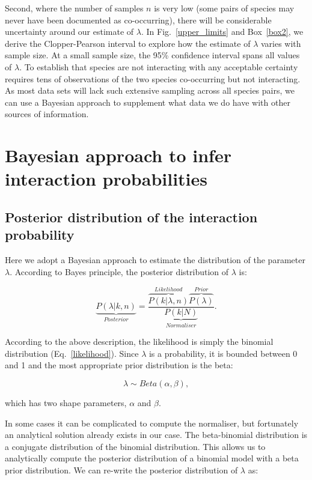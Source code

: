 \documentclass[12pt]{article}
\begin{document}
\begin{spacing}{2.0}
  Second, where the number of samples $n$ is very low (some pairs of species may never have been documented as co-occurring), there will be considerable uncertainty around our estimate of $\lambda$. In Fig.~\ref{upper_limits} and Box~\ref{box2}, we derive the Clopper-Pearson interval to explore how the estimate of $\lambda$ varies with sample size. At a small sample size, the 95\% confidence interval spans all values of $\lambda$. To establish that species are not interacting with any acceptable certainty requires tens of observations of the two species co-occurring but not interacting. As most data sets will lack such extensive sampling across all species pairs, we can use a Bayesian approach to supplement what data we do have with other sources of information.


\section*{Bayesian approach to infer interaction probabilities}

    \subsection*{Posterior distribution of the interaction probability}

      Here we adopt a Bayesian approach to estimate the distribution of the parameter $\lambda$. According to Bayes principle, the posterior distribution of $\lambda$ is:

      \begin{equation}
        \underbrace{P(\lambda|k,n)}_{Posterior} = \frac{\overbrace{P(k|\lambda,n)}^{Likelihood}\overbrace{P(\lambda)}^{Prior}}{\underbrace{P(k|N)}_{Normaliser}} .
        \label{posterior}
      \end{equation}

      According to the above description, the likelihood is simply the binomial distribution (Eq.~\ref{likelihood}). Since $\lambda$ is a probability, it is bounded between 0 and 1 and the most appropriate prior distribution is the beta:

      \begin{equation}
        \lambda \sim Beta(\alpha,\beta) , \label{prior}
      \end{equation}

      \noindent which has two shape parameters, $\alpha$ and $\beta$. 

     In some cases it can be complicated to compute the normaliser, but fortunately an analytical solution already exists in our case. The beta-binomial distribution is a conjugate distribution of the binomial distribution. This allows us to analytically compute the posterior distribution of a binomial model with a beta prior distribution. We can re-write the posterior distribution of $\lambda$ as:


\end{spacing}
\end{document}
